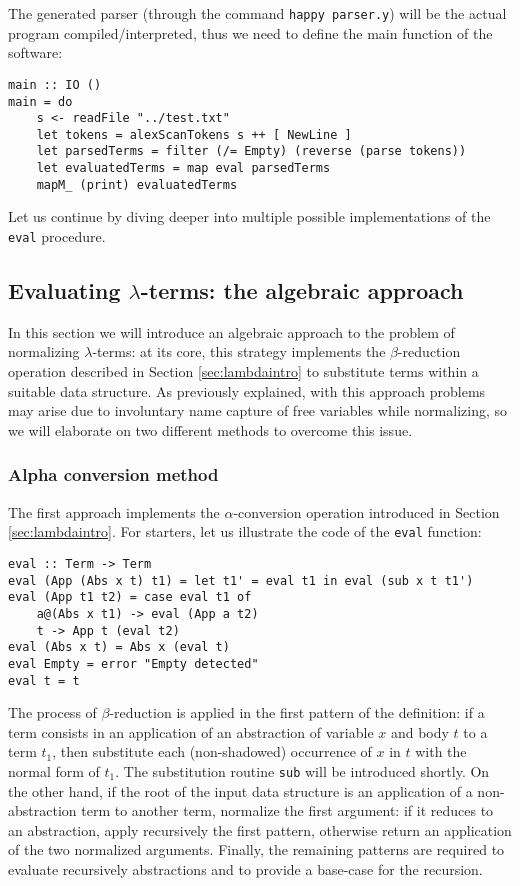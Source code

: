 \documentclass{article}
\begin{document}
The generated parser (through the command \lstinline|happy parser.y|) will be the actual program compiled/interpreted, thus we need to define the main function of the software:

\begin{lstlisting}
main :: IO ()
main = do
    s <- readFile "../test.txt"
    let tokens = alexScanTokens s ++ [ NewLine ]
    let parsedTerms = filter (/= Empty) (reverse (parse tokens))
    let evaluatedTerms = map eval parsedTerms
    mapM_ (print) evaluatedTerms
\end{lstlisting}

Let us continue by diving deeper into multiple possible implementations of the \lstinline|eval| procedure.

\subsection{Evaluating $\lambda$-terms: the algebraic approach} \label{sec:algebraic}

In this section we will introduce an algebraic approach to the problem of normalizing $\lambda$-terms: at its core, this strategy implements the $\beta$-reduction operation described in Section \ref{sec:lambdaintro} to substitute terms within a suitable data structure. As previously explained, with this approach problems may arise due to involuntary name capture of free variables while normalizing, so we will elaborate on two different methods to overcome this issue.

\subsubsection{Alpha conversion method}

The first approach implements the $\alpha$-conversion operation introduced in Section \ref{sec:lambdaintro}. For starters, let us illustrate the code of the \lstinline|eval| function:

\begin{lstlisting}
eval :: Term -> Term
eval (App (Abs x t) t1) = let t1' = eval t1 in eval (sub x t t1')
eval (App t1 t2) = case eval t1 of
    a@(Abs x t1) -> eval (App a t2)
    t -> App t (eval t2)
eval (Abs x t) = Abs x (eval t)
eval Empty = error "Empty detected"
eval t = t
\end{lstlisting}

The process of $\beta$-reduction is applied in the first pattern of the definition: if a term consists in an application of an abstraction of variable $x$ and body $t$ to a term $t_1$, then substitute each (non-shadowed) occurrence of $x$ in $t$ with the normal form of $t_1$. The substitution routine \lstinline|sub| will be introduced shortly. On the other hand, if the root of the input data structure is an application of a non-abstraction term to another term, normalize the first argument: if it reduces to an abstraction, apply recursively the first pattern, otherwise return an application of the two normalized arguments. Finally, the remaining patterns are required to evaluate recursively abstractions and to provide a base-case for the recursion.
\end{document}
